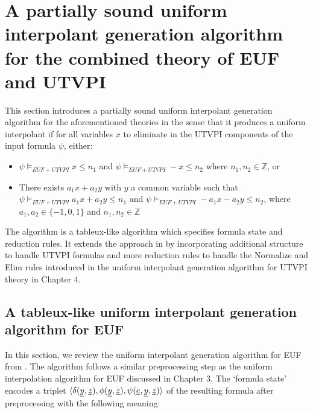 \section{A partially sound 
  uniform interpolant generation algorithm 
  for the combined theory of EUF and UTVPI}

This section introduces a partially sound uniform interpolant
generation algorithm for the aforementioned theories in the
sense that it produces a uniform interpolant if for
all variables $x$ to eliminate in the UTVPI components
of the input formula $\psi$, either:
\begin{itemize} \label{weakening_conditions}
  \item $\psi \models_{EUF + UTVPI} x \leq n_1$
    and $\psi \models_{EUF + UTVPI} -x \leq n_2$ where
    $n_1, n_2 \in \mathbb{Z}$, or
  \item There exists $a_1 x + a_2 y$ with $y$ a common
    variable such that \\
    $\psi \models_{EUF + UTVPI} a_1 x + a_2 y \leq n_1$ and
    $\psi \models_{EUF + UTVPI} -a_1 x - a_2 y \leq n_2$, 
    where $a_1, a_2 \in \{-1, 0, 1\}$ and 
    $n_1, n_2 \in \mathbb{Z}$
\end{itemize}

The algorithm is a tableux-like algorithm which specifies
formula state and reduction rules.
It extends the approach in \cite{ghilardi2020compactly}
by incorporating additional structure to handle 
UTVPI formulas and more reduction rules to handle
the Normalize and Elim rules introduced in the
uniform interpolant generation algorithm for
UTVPI theory in Chapter 4. 

\subsection{A tableux-like uniform interpolant 
  generation algorithm for EUF}

In this section, we review 
the uniform interpolant generation algorithm
for EUF from \cite{ghilardi2020compactly}. The algorithm 
follows a
similar preprocessing step as the uniform interpolation 
algorithm for EUF 
discussed in Chapter 3. The `formula state'
encodes a triplet $\langle \delta(\underline{y}, \underline{z}), 
\phi(\underline{y}, \underline{z}), \psi(\underline{e}, \underline{y}, \underline{z})
\rangle$ of the resulting formula after preprocessing 
with the following meaning:

